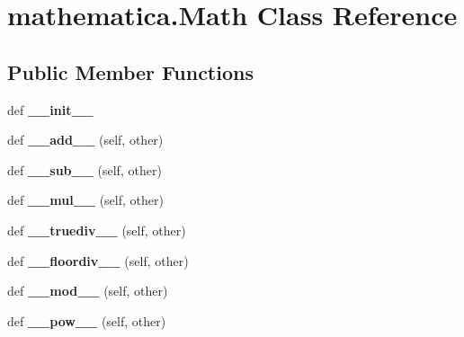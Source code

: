 \hypertarget{classmathematica_1_1Math}{}\section{mathematica.\+Math Class Reference}
\label{classmathematica_1_1Math}
\subsection*{Public Member Functions}
\begin{DoxyCompactItemize}
\item 
\mbox{\label{classmathematica_1_1Math_ab62beed9e8329d5fd939904577d269c9}} 
def {\bfseries \+\_\+\+\_\+init\+\_\+\+\_\+}
\item 
\mbox{\label{classmathematica_1_1Math_a10ebe37f89e69494932f750a2762c297}} 
def {\bfseries \+\_\+\+\_\+add\+\_\+\+\_\+} (self, other)
\item 
\mbox{\label{classmathematica_1_1Math_a53352a66669d609b659a1189501743e6}} 
def {\bfseries \+\_\+\+\_\+sub\+\_\+\+\_\+} (self, other)
\item 
\mbox{\label{classmathematica_1_1Math_a356eb24d459138e5b831b69bed042b1d}} 
def {\bfseries \+\_\+\+\_\+mul\+\_\+\+\_\+} (self, other)
\item 
\mbox{\label{classmathematica_1_1Math_ac7d35b7d8d79027ff5c934a3a1aba654}} 
def {\bfseries \+\_\+\+\_\+truediv\+\_\+\+\_\+} (self, other)
\item 
\mbox{\label{classmathematica_1_1Math_abf8cd949bceee3b150605790b452bbfc}} 
def {\bfseries \+\_\+\+\_\+floordiv\+\_\+\+\_\+} (self, other)
\item 
\mbox{\label{classmathematica_1_1Math_acc04c4d8cb48d74b39c6b9b836fabd64}} 
def {\bfseries \+\_\+\+\_\+mod\+\_\+\+\_\+} (self, other)
\item 
\mbox{\label{classmathematica_1_1Math_a526179c2dcc01e9aaa44ac277e0c3967}} 
def {\bfseries \+\_\+\+\_\+pow\+\_\+\+\_\+} (self, other)

\end{DoxyCompactItemize}
